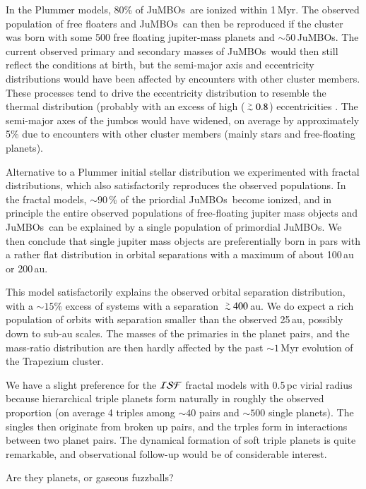 \documentclass[submission,phys]{lib/SciPost}
\def\apgt{\ {\raise-.5ex\hbox{$\buildrel>\over\sim$}}\ }
\newcommand{\jumbos}{\mbox{JuMBOs}}
\begin{document}
In the Plummer models, 80\% of \jumbos\, are ionized within 1\,Myr.
The observed population of free floaters and \jumbos\, can then be
reproduced if the cluster was born with some 500 free floating
jupiter-mass planets and $\sim 50$\,\jumbos. The current observed
primary and secondary masses of \jumbos\, would then still reflect the
conditions at birth, but the semi-major axis and eccentricity
distributions would have been affected by encounters with other
cluster members. These processes tend to drive the eccentricity
distribution to resemble the thermal distribution (probably with an
excess of high ($\apgt 0.8$) eccentricities \cite{SPZMcM2000}. The
semi-major axes of the jumbos would have widened, on average by
approximately 5\% due to encounters with other cluster members
(mainly stars and free-floating planets).

Alternative to a Plummer initial stellar distribution we experimented
with fractal distributions, which also satisfactorily reproduces the
observed populations. In the fractal models, $\sim 90$\,\% of the
priordial \jumbos\, become ionized, and in principle the entire
observed populations of free-floating jupiter mass objects and
\jumbos\, can be explained by a single population of primordial
\jumbos. We then conclude that single jupiter mass objects are
preferentially born in pars with a rather flat distribution in orbital
separations with a maximum of about 100\,au or 200\,au.

This model satisfactorily explains the observed orbital separation
distribution, with a $\sim 15$\% excess of systems with a separation
$\apgt 400$\,au. We do expect a rich population of orbits with
separation smaller than the observed 25\,au, possibly down to sub-au
scales.  The masses of the primaries in the planet pairs, and the
mass-ratio distribution are then hardly affected by the past $\sim
1$\,Myr evolution of the Trapezium cluster.

We have a slight preference for the ${\cal ISF}$ fractal models with
0.5\,pc virial radius because hierarchical triple planets form
naturally in roughly the observed proportion (on average 4 triples
among $\sim 40$ pairs and $\sim 500$ single planets). The singles then
originate from broken up pairs, and the trples form in interactions
between two planet pairs. The dynamical formation of soft triple
planets is quite remarkable, and observational follow-up would be of
considerable interest.


Are they planets, or gaseous fuzzballs?
\end{document}
